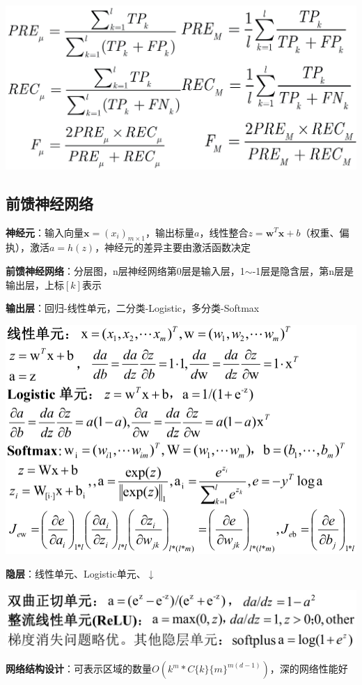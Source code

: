 	\begin{figurehere}
		\centering
		\includegraphics[width=0.8\linewidth]{image19}
		\label{fig:image19}
	\end{figurehere}
	\subsection*{前馈神经网络}
	
	\textbf{神经元}：输入向量$\mathbf{x}=(x_i)_{m\times1}$，输出标量$a$，线性整合$z=\mathbf{w}^T\mathbf{x}+b$（权重、偏执），激活$a=h(z)$，神经元的差异主要由激活函数决定
	
	\textbf{前馈神经网络}：分层图，n层神经网络第0层是输入层，1$\sim$-1层是隐含层，第n层是输出层，上标$[k]$表示
	
	\textbf{输出层}：回归-线性单元，二分类-Logistic，多分类-Softmax
	
	\begin{figurehere}
		\centering
		\includegraphics[width=1\linewidth]{image04}
		\label{fig:image04}
	\end{figurehere}
	\textbf{隐层}：线性单元、Logistic单元、$\downarrow$
	
	\begin{figurehere}
		\centering
		\includegraphics[width=1\linewidth]{image05}
		\label{fig:image05}
	\end{figurehere}
	\textbf{网络结构设计}：可表示区域的数量$O(k^m*C\{k\}\{m\}^{m(d-1)})$，深的网络性能好
	
